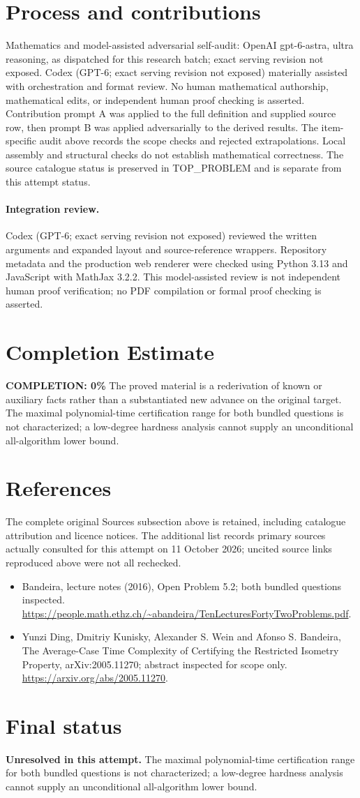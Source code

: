 \documentclass[11pt]{article}
\begin{document}
\section{Process and contributions}
Mathematics and model-assisted adversarial self-audit: OpenAI gpt-6-astra, ultra reasoning, as dispatched for this research batch; exact serving revision not exposed. Codex (GPT-6; exact serving revision not exposed) materially assisted with orchestration and format review. No human mathematical authorship, mathematical edits, or independent human proof checking is asserted.
Contribution prompt A was applied to the full definition and supplied source row, then prompt B was applied adversarially to the derived results. The item-specific audit above records the scope checks and rejected extrapolations. Local assembly and structural checks do not establish mathematical correctness. The source catalogue status is preserved in TOP\_PROBLEM and is separate from this attempt status.
\paragraph{Integration review.} Codex (GPT-6; exact serving revision not exposed) reviewed the written arguments and expanded layout and source-reference wrappers. Repository metadata and the production web renderer were checked using Python 3.13 and JavaScript with MathJax 3.2.2. This model-assisted review is not independent human proof verification; no PDF compilation or formal proof checking is asserted.

\section{Completion Estimate}
\noindent\textbf{COMPLETION: 0\%}
The proved material is a rederivation of known or auxiliary facts rather than a substantiated new advance on the original target. The maximal polynomial-time certification range for both bundled questions is not characterized; a low-degree hardness analysis cannot supply an unconditional all-algorithm lower bound.
\section{References}
The complete original Sources subsection above is retained, including catalogue attribution and licence notices. The additional list records primary sources actually consulted for this attempt on 11 October 2026; uncited source links reproduced above were not all rechecked.
\begin{itemize}
\item Bandeira, lecture notes (2016), Open Problem 5.2; both bundled questions inspected. \url{https://people.math.ethz.ch/~abandeira/TenLecturesFortyTwoProblems.pdf}.
\item Yunzi Ding, Dmitriy Kunisky, Alexander S. Wein and Afonso S. Bandeira, The Average-Case Time Complexity of Certifying the Restricted Isometry Property, arXiv:2005.11270; abstract inspected for scope only. \url{https://arxiv.org/abs/2005.11270}.
\end{itemize}
\section{Final status}
\textbf{Unresolved in this attempt.} The maximal polynomial-time certification range for both bundled questions is not characterized; a low-degree hardness analysis cannot supply an unconditional all-algorithm lower bound.
\end{document}
